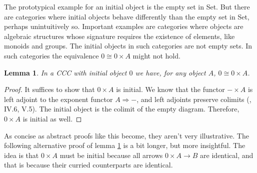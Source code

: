 \documentclass[a4paper]{article}
\newcommand{\arr}{\rightarrow}
\newcommand{\Arr}{\Rightarrow}
\newcommand{\product}{\!\times\!}
\newtheorem{lemma}[definition]{Lemma}
\begin{document}
The prototypical example for an initial object is the empty set in Set. But
there are categories where initial objects behave differently than the empty set
in Set, perhaps unintuitively so. Important examples are categories where
objects are algebraic structures whose signature requires the existence of
elements, like monoids and groups. The initial objects in such categories are
not empty sets. In such categories the equivalence $0 \cong 0 \product A$ might
not hold.

\begin{lemma} \label{lem0xAisInitial}
In a CCC with initial object $0$ we have, for any object $A$, $0 \cong 0
\product A$.
\end{lemma}

\begin{proof}
It suffices to show that $0 \product A$ is initial. We know that the functor
$- \product A$ is left adjoint to the exponent functor $A \Arr -$, and
left adjoints preserve colimits (\cite{MacLane71}, IV.6, V.5). The initial object is the colimit of the
empty diagram. Therefore, $0 \product A$ is initial as well.
\end{proof}

As concise as abstract proofs like this become, they aren't very illustrative.
The following alternative proof of lemma \ref{lem0xAisInitial} is a bit longer,
but more insightful. The idea is that $0\product A$ must be initial because all
arrows $0 \product A \arr B$ are identical, and that is because their curried
counterparts are identical.
\end{document}
